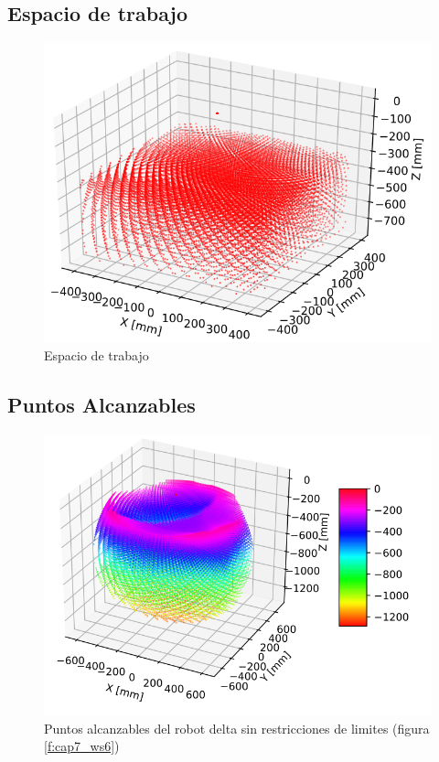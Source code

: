         \newpage

        \subsection{Espacio de trabajo}
        \begin{figure}[h]
            \centering
            \includegraphics[width=0.55\linewidth]{Main/Chapter7/Images7/ws_6.png}
            \caption{Espacio de trabajo}
            \label{f:cap7_ws6}
        \end{figure}
        
    \subsection{Puntos Alcanzables}
        \begin{figure}[h]
            \centering
            \includegraphics[width=0.82\linewidth]{Main/Chapter7/Images7/ws_1.png}
            \caption{Puntos alcanzables del robot delta sin restricciones de limites (figura \eqref{f:cap7_ws6})}
            \label{f:cap7_ws1}
        \end{figure}    
        
